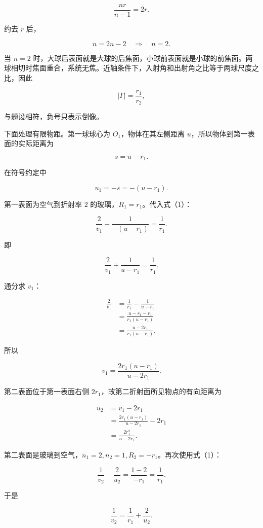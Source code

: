 \documentclass[12pt,a4paper,UTF8]{ctexart}
\begin{document}
\[
\frac{nr}{n-1}=2r. \tag{6}
\]

约去 \(r\) 后，

\[
n=2n-2
\quad\Longrightarrow\quad
\boxed{n=2}. \tag{7}
\]

当 \(n=2\)
时，大球后表面就是大球的后焦面，小球前表面就是小球的前焦面。两球相切时焦面重合，系统无焦。近轴条件下，入射角和出射角之比等于两球尺度之比，因此

\[
\left|\Gamma\right|=\frac{r_1}{r_2}, \tag{8}
\]

与题设相符，负号只表示倒像。

下面处理有限物距。第一球球心为 \(O_1\)，物体在其左侧距离
\(u\)，所以物体到第一表面的实际距离为

\[
s=u-r_1. \tag{9}
\]

在符号约定中

\[
u_1=-s=-(u-r_1). \tag{10}
\]

第一表面为空气到折射率 \(2\) 的玻璃，\(R_1=r_1\)。代入式（1）：

\[
\frac{2}{v_1}-\frac{1}{-(u-r_1)}
=\frac1{r_1}. \tag{11}
\]

即

\[
\frac{2}{v_1}+\frac1{u-r_1}=\frac1{r_1}. \tag{12}
\]

通分求 \(v_1\)：

\[
\begin{aligned}
\frac{2}{v_1}
&=\frac1{r_1}-\frac1{u-r_1}\\
&=\frac{u-r_1-r_1}{r_1(u-r_1)}\\
&=\frac{u-2r_1}{r_1(u-r_1)},
\end{aligned} \tag{13}
\]

所以

\[
v_1=\frac{2r_1(u-r_1)}{u-2r_1}. \tag{14}
\]

第二表面位于第一表面右侧 \(2r_1\)，故第二折射面所见物点的有向距离为

\[
\begin{aligned}
u_2
&=v_1-2r_1\\
&=\frac{2r_1(u-r_1)}{u-2r_1}-2r_1\\
&=\frac{2r_1^2}{u-2r_1}.
\end{aligned} \tag{15}
\]

第二表面是玻璃到空气，\(n_1=2,n_2=1,R_2=-r_1\)。再次使用式（1）：

\[
\frac1{v_2}-\frac2{u_2}
=\frac{1-2}{-r_1}
=\frac1{r_1}. \tag{16}
\]

于是

\[
\frac1{v_2}=\frac1{r_1}+\frac2{u_2}. \tag{17}
\]
\end{document}
